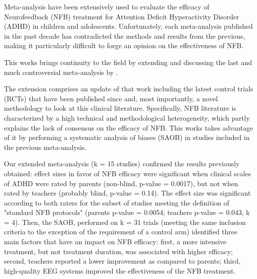 

\noindent Meta-analysis have been extensively used to
evaluate the efficacy of Neurofeedback (NFB) treatment for Attention
Deficit  Hyperactivity Disorder (ADHD) in children and adolescents. 
Unfortunately, each meta-analysis published in the past decade has contradicted the methods and
results from the previous, making it particularly difficult to forge an opinion
on the effectiveness of NFB. 

This works brings continuity to the field by extending and discussing the last and much 
controversial meta-analysis by \citet{Cortese2016}. 


The extension comprises an update of that work including the latest control trials 
(RCTs) that have been published since and, most importantly, a
novel methodology to look at this clinical literature. Specifically, NFB literature is characterized 
by a high technical and methodological heterogeneity, which partly explains the lack of consensus on 
the efficacy of NFB. This works takes advantage of it by performing a systematic analysis of
biases (SAOB) in studies included in the previous meta-analysis.

Our extended meta-analysis (k = 15 studies) confirmed the results previously
obtained: effect sizes in favor of NFB efficacy were significant when clinical scales of ADHD
were rated by parents (non-blind, p-value = 0.0017), but not when rated by
teachers (probably blind, p-value = 0.14). The effect size was significant
according to both raters for the subset of studies meeting the definition of
"standard NFB protocols" (parents p-value = 0.0054; teachers p-value = 0.043, k
= 4). Then, the SAOB, performed on k = 31 trials (meeting the same inclusion
criteria to the exception of the requirement of a control arm)
identified three main factors that have an impact on NFB efficacy: first, a more
intensive treatment, but not treatment duration, was associated with higher
efficacy; second, teachers reported a lower improvement as compared to parents;
third, high-quality EEG systems improved the effectiveness of the NFB treatment.


